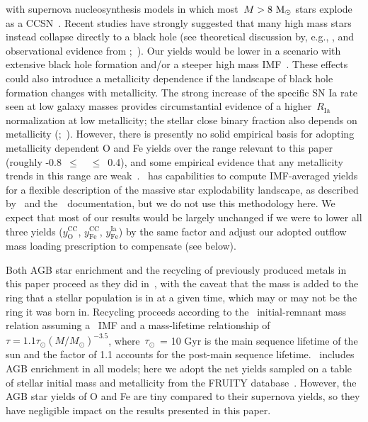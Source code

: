 with supernova nucleosynthesis models in which most~$M > 8~\text{M}_\odot$ stars explode 
as a CCSN~\citep[e.g.][]{Chieffi2004, Chieffi2013}. 
Recent studies have strongly suggested that many high mass stars instead 
collapse directly to a black hole (see theoretical discussion by, e.g., 
\citealp{Pejcha2015, Sukhbold2016, Ertl2016}, and observational evidence from 
\citealp*{Gerke2015};~\citealp{Adams2017, Basinger2021}). 
Our yields would be lower in a scenario with extensive black hole formation 
and/or a steeper high mass IMF~\citep{Griffith2021b}. 
These effects could also introduce a metallicity dependence if the landscape of 
black hole formation changes with metallicity. 
The strong increase of the specific SN Ia rate seen at low galaxy masses 
\citep{Brown2019} provides circumstantial evidence of a higher~$R_\text{Ia}$ 
normalization at low metallicity; the stellar close binary fraction also 
depends on metallicity (\citealp{Badenes2018};~\citealp*{Moe2019}). 
However, there is presently no solid empirical basis for adopting metallicity 
dependent O and Fe yields over the range relevant to this paper (roughly 
-0.8~$\leq$~\feh~$\leq$~0.4), and some empirical evidence that any metallicity 
trends in this range are weak~\citep{Weinberg2019}. 
\vice~has capabilities to compute IMF-averaged yields for a flexible 
description of the massive star explodability landscape, as described 
by~\citet{Griffith2021b} and the~\vice~documentation, but we do not use this 
methodology here. 
We expect that most of our results would be largely unchanged if we were to 
lower all three yields ($y_\text{O}^\text{CC}$, $y_\text{Fe}^\text{CC}$, 
$y_\text{Fe}^\text{Ia}$) by the same factor and adjust our adopted outflow 
mass loading prescription to compensate (see below). 
\par 
Both AGB star enrichment and the recycling of previously produced metals in 
this paper proceed as they did in~\citet{Johnson2020}, with the caveat that the 
mass is added to the ring that a stellar population is in at a given time, 
which may or may not be the ring it was born in. 
Recycling proceeds according to the~\citet{Kalirai2008} initial-remnant mass 
relation assuming a~\citet{Kroupa2001} IMF and a mass-lifetime relationship of 
$\tau = 1.1\tau_\odot(M/M_\odot)^{-3.5}$, where~$\tau_\odot$~= 10 Gyr is the 
main sequence lifetime of the sun and the factor of 1.1 accounts for the 
post-main sequence lifetime. 
\vice~includes AGB enrichment in all models; here we adopt the net yields 
sampled on a table of stellar initial mass and metallicity from the FRUITY 
database~\citep{Cristallo2011, Cristallo2015}. 
However, the AGB star yields of O and Fe are tiny compared to their 
supernova yields, so they have negligible impact on the results presented in 
this paper. 

